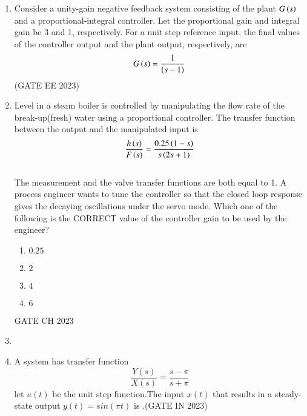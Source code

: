 \begin{enumerate}[label=\thechapter.\arabic*,ref=\thechapter.\theenumi]

\item Consider a unity-gain negative feedback system consisting of the plant $G\left(s\right)$  and a proportional-integral controller. Let the proportional gain and integral
gain be 3 and 1, respectively. For a unit step reference input, the final values of the
controller output and the plant output, respectively, are
\begin{align}
    G\left(s\right) = \frac{1}{\left(s-1\right)} \notag
\end{align}\hfill (GATE EE 2023)\\
\solution 

\newpage

\item Level  in a steam boiler is controlled by manipulating the flow rate  of the break-up(fresh) water using a proportional  controller. The transfer function between the output and the manipulated input is   \\
$$ \frac{h\left(s\right)}{F\left(s\right)}=\frac{0.25\left(1-s\right)}{s\left(2s+1\right)} $$   \\
The measurement and the valve transfer functions are both equal to 1. A process engineer wants to tune the controller so that the closed loop response gives the decaying oscillations under the servo mode. Which one of the following is the CORRECT value of the controller gain to be used by the engineer? \\
\begin{enumerate}[label=(\alph*)]
    \item $0.25$
    \item $2$
    \item $4$
    \item $6$
\end{enumerate} \hfill{GATE CH 2023} \\

\solution
\newpage
\item 

\item A system has transfer function
 \[\frac{Y(s)}{X(s)}=\frac {s-\pi}{s+\pi}\]
 let $u(t)$ be the unit step function.The input $x(t)$ that results in a steady-state output $y(t)=sin(\pi t)$ is \underline{\quad}.\hfill (GATE IN 2023)\\
 \solution
 \newpage


\end{enumerate}
